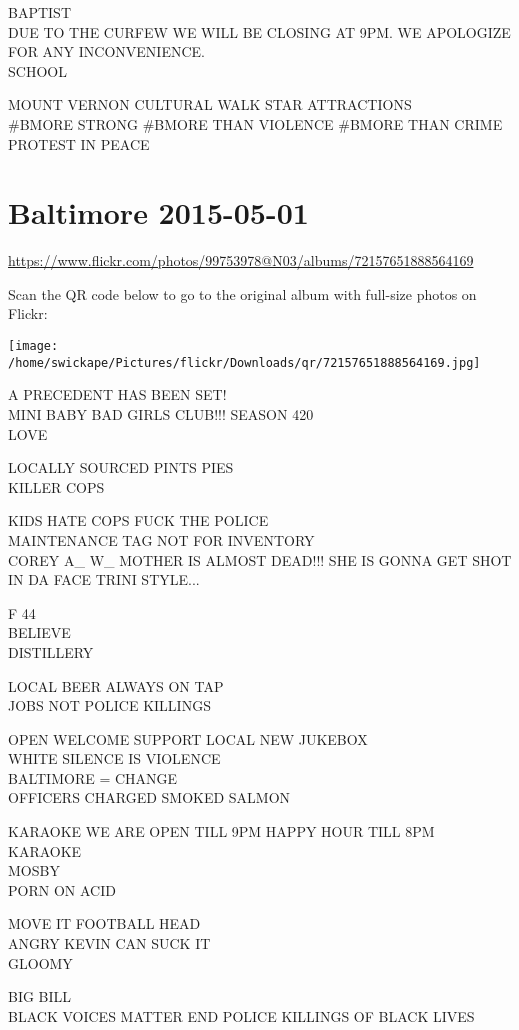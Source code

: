\documentclass[10pt,letterpaper]{article}
\begin{document}
BAPTIST\\
DUE TO THE CURFEW WE WILL BE CLOSING AT 9PM.  WE APOLOGIZE FOR ANY INCONVENIENCE.\\
SCHOOL

MOUNT VERNON CULTURAL WALK STAR ATTRACTIONS\\
\#BMORE STRONG \#BMORE THAN VIOLENCE \#BMORE THAN CRIME PROTEST IN PEACE
\pagebreak

\section*{Baltimore 2015-05-01}

\url{https://www.flickr.com/photos/99753978@N03/albums/72157651888564169}

Scan the QR code below to go to the original album with full-size photos on Flickr:

\texttt{[image: /home/swickape/Pictures/flickr/Downloads/qr/72157651888564169.jpg]}
\pagebreak

A PRECEDENT HAS BEEN SET!\\
MINI BABY BAD GIRLS CLUB!!! SEASON 420\\
LOVE

LOCALLY SOURCED PINTS PIES\\
KILLER COPS

KIDS HATE COPS FUCK THE POLICE\\
MAINTENANCE TAG NOT FOR INVENTORY\\
COREY A\_ W\_ MOTHER IS ALMOST DEAD!!!  SHE IS GONNA GET SHOT IN DA FACE TRINI STYLE...

F 44\\
BELIEVE\\
DISTILLERY

LOCAL BEER ALWAYS ON TAP\\
JOBS NOT POLICE KILLINGS

OPEN WELCOME SUPPORT LOCAL NEW JUKEBOX\\
WHITE SILENCE IS VIOLENCE\\
BALTIMORE = CHANGE\\
OFFICERS CHARGED SMOKED SALMON

KARAOKE WE ARE OPEN TILL 9PM HAPPY HOUR TILL 8PM KARAOKE\\
MOSBY\\
PORN ON ACID

MOVE IT FOOTBALL HEAD\\
ANGRY KEVIN CAN SUCK IT\\
GLOOMY

BIG BILL\\
BLACK VOICES MATTER END POLICE KILLINGS OF BLACK LIVES
\end{document}
